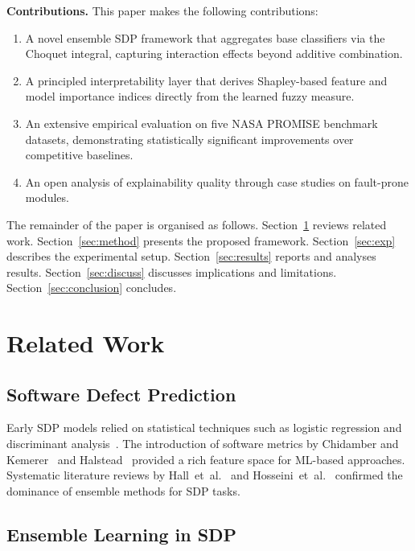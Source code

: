 \documentclass[10pt,twocolumn]{article}
\begin{document}
\noindent\textbf{Contributions.} This paper makes the following contributions:
\begin{enumerate}
  \item A novel ensemble SDP framework that aggregates base classifiers via the Choquet integral,
        capturing interaction effects beyond additive combination.
  \item A principled interpretability layer that derives Shapley-based feature and model importance
        indices directly from the learned fuzzy measure.
  \item An extensive empirical evaluation on five NASA PROMISE benchmark datasets, demonstrating
        statistically significant improvements over competitive baselines.
  \item An open analysis of explainability quality through case studies on fault-prone modules.
\end{enumerate}

The remainder of the paper is organised as follows. Section~\ref{sec:related} reviews related work.
Section~\ref{sec:method} presents the proposed framework. Section~\ref{sec:exp} describes the
experimental setup. Section~\ref{sec:results} reports and analyses results. Section~\ref{sec:discuss}
discusses implications and limitations. Section~\ref{sec:conclusion} concludes.

\section{Related Work}
\label{sec:related}

\subsection{Software Defect Prediction}

Early SDP models relied on statistical techniques such as logistic regression and
discriminant analysis~\cite{menzies2007data}. The introduction of software metrics by
Chidamber and Kemerer~\cite{chidamber1994metrics} and Halstead~\cite{halstead1977elements}
provided a rich feature space for ML-based approaches. Systematic literature reviews by
Hall~et~al.~\cite{hall2012systematic} and Hosseini~et~al.~\cite{hosseini2017benchmark}
confirmed the dominance of ensemble methods for SDP tasks.

\subsection{Ensemble Learning in SDP}
\end{document}
